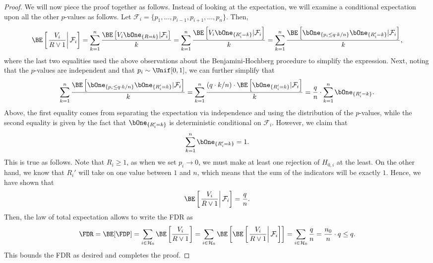 \documentclass[11pt,reqno]{report}
\theoremstyle{definition}
\numberwithin{equation}{section}
\begin{document}
\begin{proof}
We will now piece the proof together as follows. Instead of looking at the expectation, we will examine a conditional expectation upon all the other $p$-values as follows. Let $\mathcal{F}_i = \{ p_1, \ldots, p_{i-1}, p_{i+1}, \ldots, p_n \}$. Then,
\begin{equation}
\BE \left[ \left. \frac{V_i}{R \vee 1} \right| \mathcal{F}_i  \right] = \sum_{k=1}^n \frac{\BE\left[ V_i \bOne_{\{R = k\}} | \mathcal{F}_i \right]}{k} = \sum_{k=1}^n \frac{\BE\left[ V_i \bOne_{\{ R_i' = k \}} | \mathcal{F}_i \right]}{k} =  \sum_{k=1}^n \frac{\BE\left[ \bOne_{\{ p_i \leq q \cdot k / n \}} \bOne_{\{ R_i' = k \}} | \mathcal{F}_i \right]}{k},
\end{equation}
where the last two equalities used the above observations about the Benjamini-Hochberg procedure to simplify the expression. Next, noting that the $p$-values are independent and that $p_i \sim \Unif[0,1]$, we can further simplify that
\begin{equation}
\sum_{k=1}^n \frac{\BE\left[ \bOne_{\{ p_i \leq q \cdot k / n \}} \bOne_{\{ R_i' = k \}} | \mathcal{F}_i \right]}{k} = \sum_{k=1}^n \frac{\left( q \cdot k / n \right) \cdot \BE\left[ \bOne_{\{ R_i' = k \}} | \mathcal{F}_i \right]}{k} = \frac{q}{n} \cdot \sum_{k=1}^n \bOne_{\{ R_i' = k \}}.
\end{equation}
Above, the first equality comes from separating the expectation via independence and using the distribution of the $p$-values, while the second equality is given by the fact that $\bOne_{\{ R_i' = k \}}$ is deterministic conditional on $\mathcal{F}_i$. However, we claim that
\begin{equation}
 \sum_{k=1}^n \bOne_{\{ R_i' = k \}} = 1.
\end{equation} This is true as follows. Note that $R_i \geq 1$, as when we set $p_i \to 0$, we must make at least one rejection of $H_{0, i}$ at the least. On the other hand, we know that $R_i'$ will take on one value between $1$ and $n$, which means that the sum of the indicators will be exactly $1$. Hence, we have shown that
\[ \BE \left[ \left. \frac{V_i}{R \vee 1} \right| \mathcal{F}_i  \right] = \frac{q}{n}. \] Then, the law of total expectation allows to write the FDR as
\[ \FDR = \BE[\FDP] = \sum_{i \in \mathcal{H}_0} \BE\left[ \frac{V_i}{R \vee 1} \right] = \sum_{i \in \mathcal{H}_0} \BE \left[ \BE\left[ \left. \frac{V_i}{R \vee 1}  \right| \mathcal{F}_i \right] \right] = \sum_{i \in \mathcal{H}_0} \frac{q}{n} = \frac{n_0}{n} \cdot q \leq q.  \] This bounds the FDR as desired and completes the proof.
\end{proof}
\end{document}
